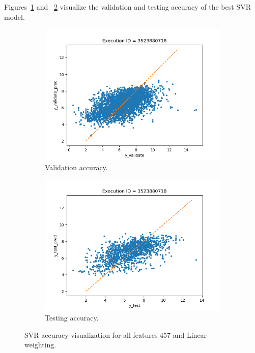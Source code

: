 \documentclass[11pt]{article}
\begin{document}
Figures~\ref{fig:SVRvalidate} and ~\ref{fig:SVRtest} visualize the validation and testing accuracy of the best SVR model.

\begin{figure}
     \centering
     \begin{subfigure}[b]{0.45\textwidth}
         \centering
         \includegraphics[scale=0.45]{images/SVRvalidate}
         \caption{Validation accuracy.}
        \label{fig:SVRvalidate}
     \end{subfigure}
     \hfill
     \begin{subfigure}[b]{0.45\textwidth}
         \centering
         \includegraphics[scale=0.45]{images/SVRtest}
        \caption{Testing accuracy.}
        \label{fig:SVRtest}
     \end{subfigure}
     \caption{SVR accuracy visualization for all features 457 and Linear weighting.}
     \label{fig:SVRaccuracy}
\end{figure}
\end{document}
